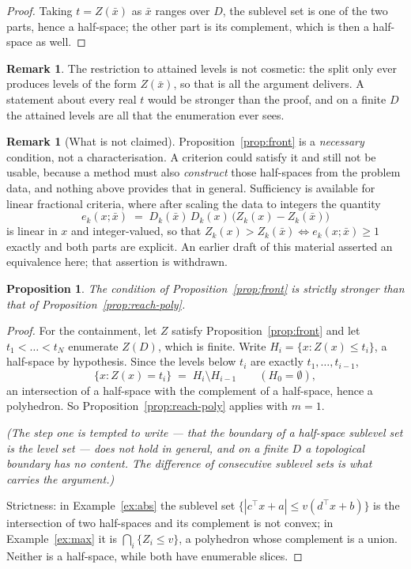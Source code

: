 \documentclass[11pt,a4paper]{article}
\newcommand{\Dset}{D}
\newcommand{\Z}{Z}
\theoremstyle{plain}
\newtheorem{proposition}[theorem]{Proposition}
\theoremstyle{definition}
\newtheorem{remark}[theorem]{Remark}
\begin{document}
\begin{proof}
Taking $t = \Z(\bar x)$ as $\bar x$ ranges over $\Dset$, the sublevel set is
one of the two parts, hence a half-space; the other part is its complement,
which is then a half-space as well.
\end{proof}

\begin{remark}
The restriction to attained levels is not cosmetic: the split only ever
produces levels of the form $\Z(\bar x)$, so that is all the argument delivers.
A statement about every real $t$ would be stronger than the proof, and on a
finite $\Dset$ the attained levels are all that the enumeration ever sees.
\end{remark}

\begin{remark}[What is not claimed]\label{rem:notexact}
Proposition~\ref{prop:front} is a \emph{necessary} condition, not a
characterisation.  A criterion could satisfy it and still not be usable,
because a method must also \emph{construct} those half-spaces from the problem
data, and nothing above provides that in general.  Sufficiency is available for
linear fractional criteria, where after scaling the data to integers the
quantity
\[
  e_k(x ; \bar x) \;=\; D_k(\bar x)\,D_k(x)\,
  \bigl(\Z_k(x) - \Z_k(\bar x)\bigr)
\]
is linear in $x$ and integer-valued, so that
$\Z_k(x) > \Z_k(\bar x) \iff e_k(x;\bar x) \geqslant 1$ exactly and both parts
are explicit.  An earlier draft of this material asserted an equivalence here;
that assertion is withdrawn.
\end{remark}

\begin{proposition}\label{prop:gap}
The condition of Proposition~\ref{prop:front} is strictly stronger than that of
Proposition~\ref{prop:reach-poly}.
\end{proposition}

\begin{proof}
For the containment, let $\Z$ satisfy Proposition~\ref{prop:front} and let
$t_1 < \dots < t_N$ enumerate $\Z(\Dset)$, which is finite.  Write
$H_i = \{x : \Z(x) \leqslant t_i\}$, a half-space by hypothesis.  Since the
levels below $t_i$ are exactly $t_1,\dots,t_{i-1}$,
\[
  \{x : \Z(x) = t_i\} \;=\; H_i \setminus H_{i-1}
  \qquad (H_0 = \emptyset) ,
\]
an intersection of a half-space with the complement of a half-space, hence a
polyhedron.  So Proposition~\ref{prop:reach-poly} applies with $m = 1$.

\emph{(The step one is tempted to write --- that the boundary of a half-space
sublevel set is the level set --- does not hold in general, and on a finite
$\Dset$ a topological boundary has no content.  The difference of consecutive
sublevel sets is what carries the argument.)}

Strictness: in Example~\ref{ex:abs} the
sublevel set $\{|c^{\top}x+a| \leqslant v(d^{\top}x+b)\}$ is the intersection
of two half-spaces and its complement is not convex; in Example~\ref{ex:max} it
is $\bigcap_i \{\Z_i \leqslant v\}$, a polyhedron whose complement is a union.
Neither is a half-space, while both have enumerable slices.
\end{proof}
\end{document}
